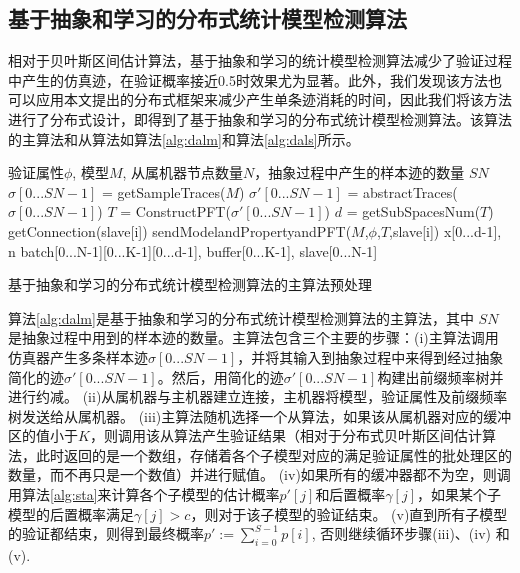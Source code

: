\subsection{基于抽象和学习的分布式统计模型检测算法}
相对于贝叶斯区间估计算法，基于抽象和学习的统计模型检测算法减少了验证过程中产生的仿真迹，在验证概率接近0.5时效果尤为显著。此外，我们发现该方法也可以应用本文提出的分布式框架来减少产生单条迹消耗的时间，因此我们将该方法进行了分布式设计，即得到了基于抽象和学习的分布式统计模型检测算法。该算法的主算法和从算法如算法\ref{alg:dalm}和算法\ref{alg:dals}所示。
\begin{algorithm}[t]
\begin{algorithmic}[1]
\REQUIRE 验证属性$\phi$, 模型$M$, 从属机器节点数量$N$，抽象过程中产生的样本迹的数量 $SN$
\STATE $\sigma[0...SN-1]$ = getSampleTraces($M$)
\STATE $\sigma'[0...SN-1]$ = abstractTraces($\sigma[0...SN-1]$)
\STATE $T$ = ConstructPFT($\sigma'[0...SN-1]$)
\STATE $d$ = getSubSpacesNum($T$)
\LOOP
\STATE getConnection(slave[i])
\STATE sendModelandPropertyandPFT($M$,$\phi$,$T$,slave[i])
\RETURN
\ENDIF
\ENDLOOP
\STATE x[0...d-1], n
\STATE batch[0...N-1][0...K-1][0...d-1], buffer[0...K-1], slave[0...N-1]
\end{algorithmic}
\caption{基于抽象和学习的分布式统计模型检测算法的主算法预处理}
\label{alg:dalmy}
\end{algorithm}
算法\ref{alg:dalm}是基于抽象和学习的分布式统计模型检测算法的主算法，其中  $SN$是抽象过程中用到的样本迹的数量。主算法包含三个主要的步骤：(i)主算法调用仿真器产生多条样本迹$\sigma[0...SN-1]$，并将其输入到抽象过程中来得到经过抽象简化的迹$\sigma'[0...SN-1]$。然后，用简化的迹$\sigma'[0...SN-1]$构建出前缀频率树并进行约减。 (ii)从属机器与主机器建立连接，主机器将模型，验证属性及前缀频率树发送给从属机器。 (iii)主算法随机选择一个从算法，如果该从属机器对应的缓冲区的值小于$K$，则调用该从算法产生验证结果（相对于分布式贝叶斯区间估计算法，此时返回的是一个数组，存储着各个子模型对应的满足验证属性的批处理区的数量，而不再只是一个数值）并进行赋值。 (iv)如果所有的缓冲器都不为空，则调用算法\ref{alg:sta}来计算各个子模型的估计概率$p'[j]$和后置概率$\gamma[j]$，如果某个子模型的后置概率满足$\gamma[j] > c$，则对于该子模型的验证结束。 (v)直到所有子模型的验证都结束，则得到最终概率$p' := \sum\limits_{i=0}^{S-1} p[i]$, 否则继续循环步骤(iii)、(iv) 和 (v).
